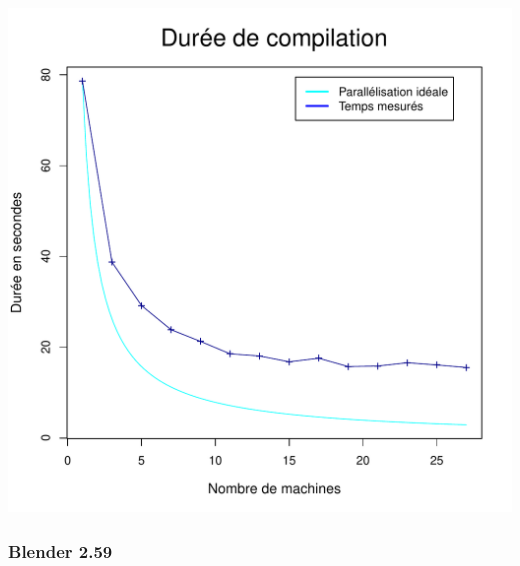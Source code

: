 \documentclass[a4paper, 11pt, titlepage]{article}
\begin{document}
\begin{center}
    \includegraphics[scale=0.45]{res/sujet_makefiles_blender_249_Makefile-recurse_nth1.pdf}
\end{center}


\subsubsection {Blender 2.59}
\end{document}
